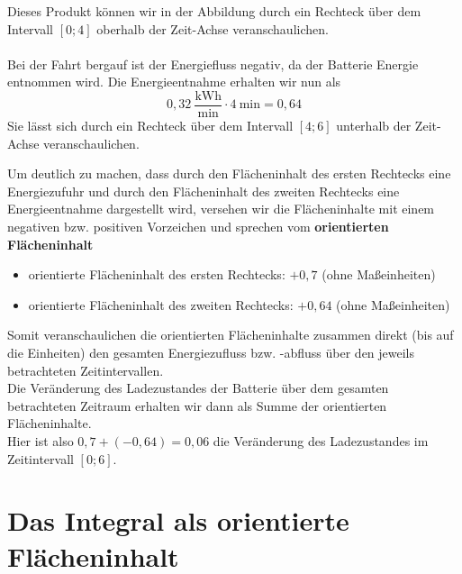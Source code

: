 Dieses Produkt können wir in der Abbildung durch ein Rechteck über dem Intervall $[0;4]$ oberhalb der Zeit-Achse veranschaulichen.\\
\ \\

Bei der Fahrt bergauf ist der Energiefluss negativ, da der Batterie Energie entnommen wird. Die Energieentnahme erhalten wir nun als $$0,32 \ \frac{\text{kWh}}{\text{min}} \cdot 4 \ \text{min} = 0,64$$
Sie lässt sich durch ein Rechteck über dem Intervall $[4;6]$ unterhalb der Zeit-Achse veranschaulichen. 

Um deutlich zu machen, dass durch den Flächeninhalt des ersten Rechtecks eine Energiezufuhr und durch den Flächeninhalt des zweiten Rechtecks eine Energieentnahme dargestellt wird, versehen wir die Flächeninhalte mit einem negativen bzw. positiven Vorzeichen und sprechen vom \textbf{orientierten Flächeninhalt}
\begin{itemize}
    \item orientierte Flächeninhalt des ersten Rechtecks: $+0,7$ (ohne Maßeinheiten)
    \item orientierte Flächeninhalt des zweiten Rechtecks: $+0,64$ (ohne Maßeinheiten)
\end{itemize}
Somit veranschaulichen die orientierten Flächeninhalte zusammen direkt (bis auf die Einheiten) den gesamten Energiezufluss bzw. -abfluss über den jeweils betrachteten Zeitintervallen. \\
Die Veränderung des Ladezustandes der Batterie über dem gesamten betrachteten Zeitraum erhalten wir dann als Summe der orientierten Flächeninhalte. \\
Hier ist also $0,7 + (-0,64) = 0,06$ die Veränderung des Ladezustandes im Zeitintervall $[0;6]$.

\section{Das Integral als orientierte Flächeninhalt}

